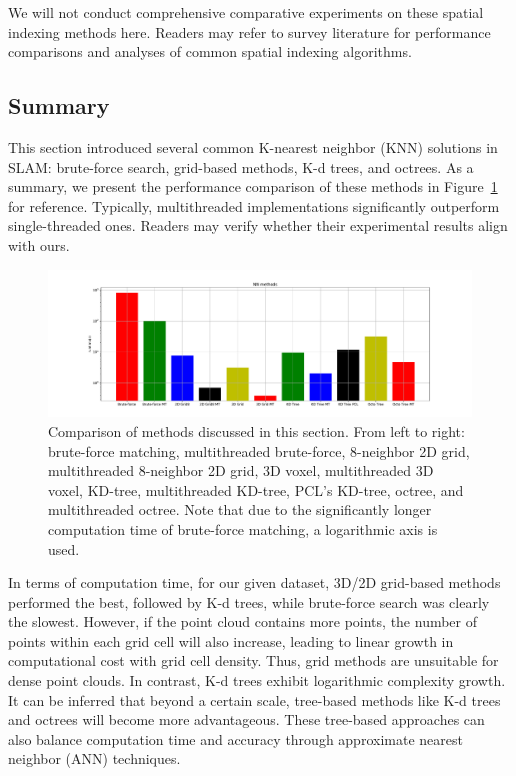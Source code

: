 We will not conduct comprehensive comparative experiments on these spatial indexing methods here. Readers may refer to survey literature \cite{Mahapatra2015, Bhatia2010} for performance comparisons and analyses of common spatial indexing algorithms.

\subsection{Summary}
This section introduced several common K-nearest neighbor (KNN) solutions in SLAM: brute-force search, grid-based methods, K-d trees, and octrees. As a summary, we present the performance comparison of these methods in Figure~\ref{fig:nn-compare} for reference. Typically, multithreaded implementations significantly outperform single-threaded ones. Readers may verify whether their experimental results align with ours.

\begin{figure}[!htp]
	\centering
	\includegraphics[width=1.0\textwidth]{resources/basic-point-cloud/nn-compare.pdf}
	\caption{Comparison of methods discussed in this section. From left to right: brute-force matching, multithreaded brute-force, 8-neighbor 2D grid, multithreaded 8-neighbor 2D grid, 3D voxel, multithreaded 3D voxel, KD-tree, multithreaded KD-tree, PCL's KD-tree, octree, and multithreaded octree. Note that due to the significantly longer computation time of brute-force matching, a logarithmic axis is used.}
	\label{fig:nn-compare}
\end{figure}

In terms of computation time, for our given dataset, 3D/2D grid-based methods performed the best, followed by K-d trees, while brute-force search was clearly the slowest. However, if the point cloud contains more points, the number of points within each grid cell will also increase, leading to linear growth in computational cost with grid cell density. Thus, grid methods are unsuitable for dense point clouds. In contrast, K-d trees exhibit logarithmic complexity growth. It can be inferred that beyond a certain scale, tree-based methods like K-d trees and octrees will become more advantageous. These tree-based approaches can also balance computation time and accuracy through approximate nearest neighbor (ANN) techniques.

